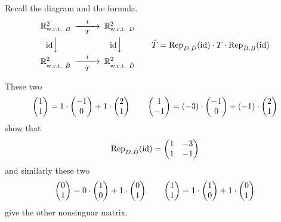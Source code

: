 \begin{exercises}
\begin{exparts}
    \end{exparts}
    \begin{answer}
      Recall the diagram
      and the formula.
      \begin{equation*}
        \begin{CD}
          \Re^2_\wrt{B}                   @>t>T>        \Re^2_\wrt{D}       \\
          @V\scriptstyle\identity VV             @V\scriptstyle\identity VV \\
          \Re^2_\wrt{\hat{B}}             @>t>\hat{T}>  \Re^2_\wrt{\hat{D}}
        \end{CD}
        \qquad \hat{T}=
         \rep{\identity}{D,\hat{D}}\cdot T\cdot \rep{\identity}{\hat{B},B}
      \end{equation*}
      \begin{exparts}
        \partsitem These two 
          \begin{equation*}
            \begin{pmatrix} 1 \\ 1 \end{pmatrix}=1\cdot\begin{pmatrix} -1 \\ 0 \end{pmatrix}
                            +1\cdot\begin{pmatrix} 2 \\ 1 \end{pmatrix}
            \qquad
            \begin{pmatrix} 1 \\ -1 \end{pmatrix}=(-3)\cdot\begin{pmatrix} -1 \\ 0 \end{pmatrix}
                            +(-1)\cdot\begin{pmatrix} 2 \\ 1 \end{pmatrix}
          \end{equation*}
          show that
          \begin{equation*}
            {\rm Rep}_{D,\hat{D}}(\mbox{id})=\begin{pmatrix}
              1  &-3  \\
              1  &-1
            \end{pmatrix}
          \end{equation*}
          and similarly these two
          \begin{equation*}
            \begin{pmatrix} 0 \\ 1 \end{pmatrix}=0\cdot\begin{pmatrix} 1 \\ 0 \end{pmatrix}
                            +1\cdot\begin{pmatrix} 0 \\ 1 \end{pmatrix}
            \qquad
            \begin{pmatrix} 1 \\  1 \end{pmatrix}=1\cdot\begin{pmatrix} 1 \\ 0 \end{pmatrix}
                            +1\cdot\begin{pmatrix} 0 \\ 1 \end{pmatrix}
          \end{equation*}
          give the other nonsinguar matrix.
          \begin{equation*}

\end{equation*}
\end{exparts}
\end{answer}
\end{exercises}
